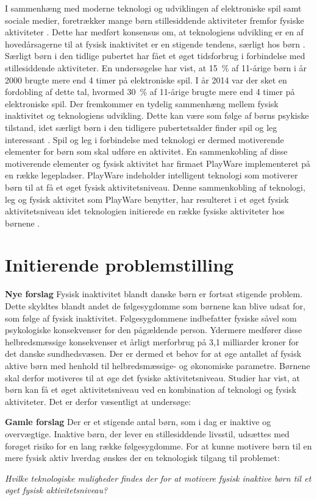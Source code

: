 I sammenhæng med moderne teknologi og udviklingen af elektroniske spil samt sociale medier, foretrækker mange børn stillesiddende aktiviteter fremfor fysiske aktiviteter \citep{Universitet2014}. Dette har medført konsensus om, at teknologiens udvikling er en af hovedårsagerne til at fysisk inaktivitet er en stigende tendens, særligt hos børn \citep{Kiens2007}. \newline
Særligt børn i den tidlige pubertet har fået et øget tidsforbrug i forbindelse med stillesiddende aktiviteter. En undersøgelse har vist, at 15~\% af 11-årige børn i år 2000 brugte mere end 4 timer på elektroniske spil. I år 2014 var der sket en fordobling af dette tal, hvormed 30~\% af 11-årige brugte mere end 4 timer på elektroniske spil. \citep{Universitet2014} \newline
Der fremkommer en tydelig sammenhæng mellem fysisk inaktivitet og teknologiens udvikling. Dette kan være som følge af børns psykiske tilstand, idet særligt børn i den tidligere pubertetsalder finder spil og leg interessant \citep{Wied2011}. Spil og leg i forbindelse med teknologi er dermed motiverende elementer for børn som skal udføre en aktivitet. En sammenkobling af disse motiverende elementer og fysisk aktivitet har firmaet PlayWare implementeret på en række legepladser. PlayWare indeholder intelligent teknologi som motiverer børn til at få et øget fysisk aktivitetsniveau. Denne sammenkobling af teknologi, leg og fysisk aktivitet som PlayWare benytter, har resulteret i et øget fysisk aktivitetsniveau idet teknologien initierede en række fysiske aktiviteter hos børnene \citep{Rishoej2010}. 

\section{Initierende problemstilling}
\textbf{Nye forslag}
Fysisk inaktivitet blandt danske børn er fortsat stigende problem. Dette skyldtes blandt andet de følgesygdomme som børnene kan blive udsat for, som følge af fysisk inaktivitet. Følgesygdommene indbefatter fysiske såvel som psykologiske konsekvenser for den pågældende person. Ydermere medfører disse helbredsmæssige konsekvenser et årligt merforbrug på 3,1 milliarder kroner for det danske sundhedsvæsen. \newline
Der er dermed et behov for at øge antallet af fysisk aktive børn med henhold til helbredsmæssige- og økonomiske parametre. Børnene skal derfor motiveres til at øge det fysiske aktivitetsniveau. Studier har vist, at børn kan få et øget aktivitetsniveau ved en kombination af teknologi og fysisk aktiviteter. Det er derfor væsentligt at undersøge: 

\textbf{Gamle forslag}
Der er et stigende antal børn, som i dag er inaktive og overvægtige. Inaktive børn, der lever en stillesiddende livsstil, udsættes med forøget risiko for en lang række følgesygdomme. For at kunne motivere børn til en mere fysisk aktiv hverdag ønskes der en teknologisk tilgang til problemet:

\begin{center}
\textit{Hvilke teknologiske muligheder findes der for at motivere fysisk inaktive børn til et øget fysisk aktivitetsniveau?}
\end{center}